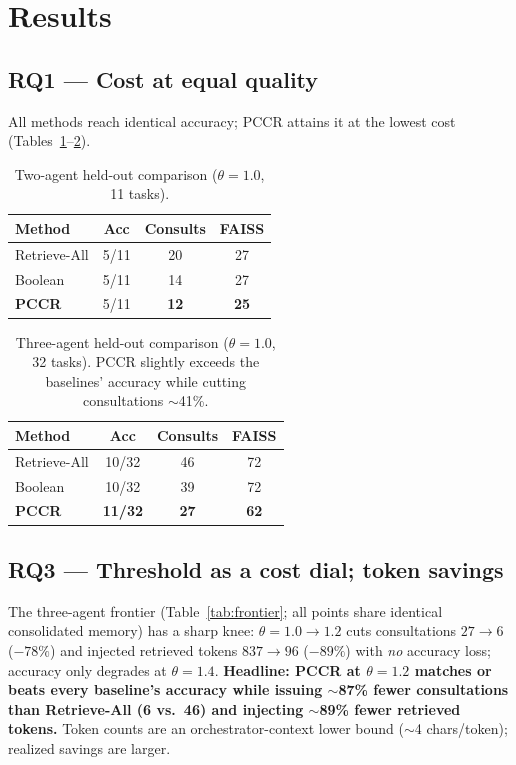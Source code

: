 \documentclass[10pt,twocolumn]{article}
\begin{document}
\section{Results}\label{sec:results}

\subsection{RQ1 --- Cost at equal quality}
All methods reach identical accuracy; PCCR attains it at the lowest cost
(Tables~\ref{tab:cmp2}--\ref{tab:cmp3}).

\begin{table}[t]
\centering\small
\begin{tabular}{@{}lccc@{}}
\toprule
Method & Acc & Consults & FAISS \\
\midrule
Retrieve-All & 5/11 & 20 & 27 \\
Boolean      & 5/11 & 14 & 27 \\
\textbf{PCCR}& 5/11 & \textbf{12} & \textbf{25} \\
\bottomrule
\end{tabular}
\caption{Two-agent held-out comparison ($\theta{=}1.0$, 11 tasks).}
\label{tab:cmp2}
\end{table}

\begin{table}[t]
\centering\small
\begin{tabular}{@{}lccc@{}}
\toprule
Method & Acc & Consults & FAISS \\
\midrule
Retrieve-All & 10/32 & 46 & 72 \\
Boolean      & 10/32 & 39 & 72 \\
\textbf{PCCR}& \textbf{11/32} & \textbf{27} & \textbf{62} \\
\bottomrule
\end{tabular}
\caption{Three-agent held-out comparison ($\theta{=}1.0$, 32 tasks). PCCR
slightly exceeds the baselines' accuracy while cutting consultations
$\sim$41\%.}
\label{tab:cmp3}
\end{table}

\subsection{RQ3 --- Threshold as a cost dial; token savings}
The three-agent frontier (Table~\ref{tab:frontier}; all points share identical
consolidated memory) has a sharp knee: $\theta{=}1.0{\rightarrow}1.2$ cuts
consultations $27{\rightarrow}6$ ($-78\%$) and injected retrieved tokens
$837{\rightarrow}96$ ($-89\%$) with \emph{no} accuracy loss; accuracy only
degrades at $\theta{=}1.4$. \textbf{Headline: PCCR at $\theta{=}1.2$ matches or
beats every baseline's accuracy while issuing $\sim$87\% fewer consultations than
Retrieve-All (6 vs.\ 46) and injecting $\sim$89\% fewer retrieved tokens.} Token
counts are an orchestrator-context lower bound ($\sim$4 chars/token); realized
savings are larger.
\end{document}
